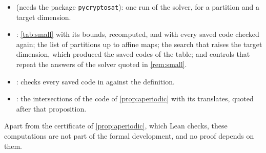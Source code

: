 \begin{itemize}[leftmargin=1.5em]
\item {} (needs the package \texttt{pycryptosat}): one run of the solver, for a
partition and a target dimension.
\item {}: \cref{tab:small} with its bounds, recomputed, and with every saved code checked
again; the list of partitions up to affine maps; the search that raises the target dimension, which produced the saved
codes of the table; and controls that repeat the answers of the solver quoted in \cref{rem:small}.
\item {}: checks every saved code in  against the
definition.
\item {}: the intersections of the code of \cref{prop:aperiodic} with its translates,
quoted after that proposition.
\end{itemize}
Apart from the certificate of \cref{prop:aperiodic}, which Lean checks, these computations are not part of the formal
development, and no proof depends on them.

